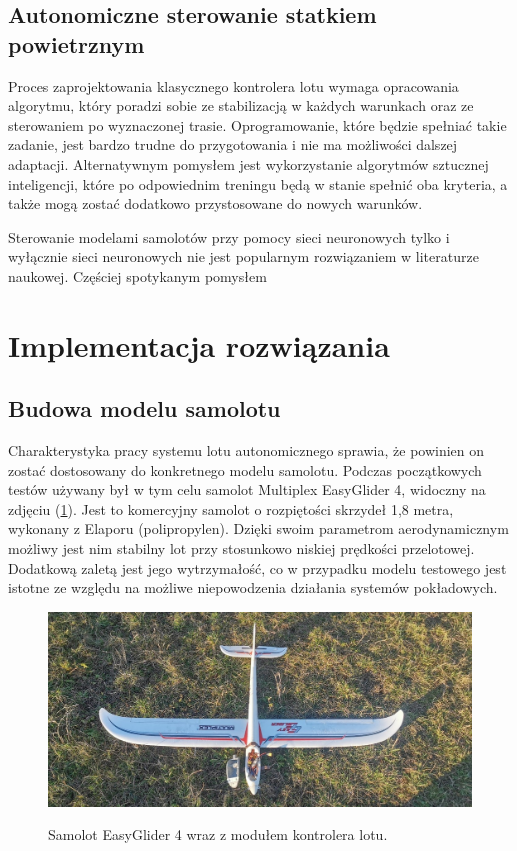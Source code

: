 \documentclass[12pt, a4paper]{article}
\let\oldref\ref
\renewcommand{\ref}[1]{(\oldref{#1})}
\begin{document}
\subsection{Autonomiczne sterowanie statkiem powietrznym}
Proces zaprojektowania klasycznego kontrolera lotu wymaga opracowania algorytmu, który poradzi sobie ze stabilizacją w każdych warunkach oraz ze sterowaniem po wyznaczonej trasie. Oprogramowanie, które będzie spełniać takie zadanie, jest bardzo trudne do przygotowania i nie ma możliwości dalszej adaptacji. Alternatywnym pomysłem jest wykorzystanie algorytmów sztucznej inteligencji, które po odpowiednim treningu będą w stanie spełnić oba kryteria, a także mogą zostać dodatkowo przystosowane do nowych warunków. 

Sterowanie modelami samolotów przy pomocy sieci neuronowych tylko i wyłącznie sieci neuronowych nie jest popularnym rozwiązaniem w literaturze naukowej. Częściej spotykanym pomysłem 

\clearpage
\section{Implementacja rozwiązania}
\subsection{Budowa modelu samolotu}
Charakterystyka pracy systemu lotu autonomicznego sprawia, że powinien  on zostać dostosowany do konkretnego modelu samolotu. Podczas początkowych testów używany był w tym celu samolot Multiplex EasyGlider 4, widoczny na zdjęciu \ref{fig:eg4}. Jest to komercyjny samolot o rozpiętości skrzydeł 1,8 metra, wykonany z Elaporu (polipropylen). Dzięki swoim parametrom aerodynamicznym możliwy jest nim stabilny lot przy stosunkowo niskiej prędkości przelotowej. Dodatkową zaletą jest jego wytrzymałość, co w przypadku modelu testowego jest istotne ze względu na możliwe niepowodzenia działania systemów pokładowych.

\begin{figure}[ht]
    \centering
    \includegraphics[width=1\textwidth]{budowa1}\\
    \caption{Samolot EasyGlider 4 wraz z modułem kontrolera lotu.}
    \label{fig:eg4}
\end{figure}
\end{document}
